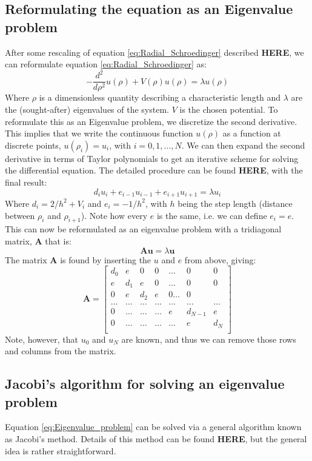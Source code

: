 \documentclass[a4paper, 10pt]{article}
\begin{document}
\subsection{Reformulating the equation as an Eigenvalue problem}
After some rescaling of equation \ref{eq:Radial_Schroedinger} described \textbf{HERE}, we can reformulate equation \ref{eq:Radial_Schroedinger} as:
\begin{equation}
-\frac{d^2}{d\rho^2}u(\rho)+V(\rho)u(\rho)=\lambda u(\rho)
\end{equation}
Where $\rho$ is a dimensionless quantity describing a characteristic length and $\lambda$ are the (sought-after) eigenvalues of the system. $V$ is the chosen potential. To reformulate this as an Eigenvalue problem, we discretize the second derivative. This implies that we write the continuous function $u(\rho)$ as a function at discrete points, $u(\rho_i)=u_i$, with $i=0,1,...,N$. We can then expand the second derivative in terms of Taylor polynomials to get an iterative scheme for solving the differential equation. The detailed procedure can be found \textbf{HERE}, with the final result:
\begin{equation}
d_iu_i+e_{i-1}u_{i-1}+e_{i+1}u_{i+1}=\lambda u_i
\end{equation}
Where  $d_i=2/h^2+V_i$ and $e_i=-1/h^2$, with $h$ being the step length (distance between $\rho_i$ and $\rho_{i+1}$). Note how every $e$ is the same, i.e. we can define $e_i=e$. This can now be reformulated as an eigenvalue problem with a tridiagonal matrix, $\mathbf{A}$ that is:
\begin{equation}\label{eq:Eigenvalue_problem}
\mathbf{A}\mathbf{u}=\lambda \mathbf{u}
\end{equation}
The matrix $\mathbf{A}$ is found by inserting the $u$ and $e$ from above, giving:
$$\mathbf{A}=\begin{bmatrix}
d_0 & e & 0 & 0 & \dots & 0 & 0\\
e & d_1 & e & 0 & \dots & 0 & 0\\
0 & e & d_2 & e & 0 \dots & 0\\
\dots & \dots & \dots & \dots & \dots& \dots & \dots \\
0 & \dots & \dots &\dots & e & d_{N-1} & e\\
0 & \dots & \dots & \dots & \dots & e & d_N\\
\end{bmatrix}$$
Note, however, that $u_0$ and $u_N$ are known, and thus we can remove those rows and columns from the matrix.
\subsection{Jacobi's algorithm for solving an eigenvalue problem}
Equation \ref{eq:Eigenvalue_problem} can be solved via a general algorithm known as Jacobi's method. Details of this method can be found \textbf{HERE}, but the general idea is rather straightforward. 
\end{document}
